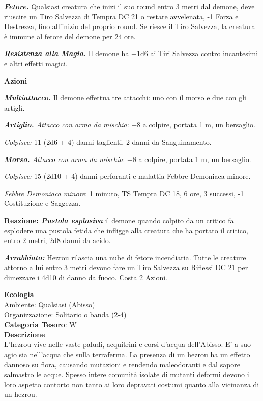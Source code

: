 \begin{multicols}{2}
{\emph{\textbf{Fetore.}} Qualsiasi creatura che inizi il suo round entro 3 metri dal demone, deve riuscire un Tiro Salvezza di Tempra DC 21 o restare avvelenata, -1 Forza e Destrezza, fino all'inizio del proprio round. Se riesce il Tiro Salvezza, la creatura è immune al fetore del demone per 24 ore.

\emph{\textbf{Resistenza alla Magia.}} Il demone ha +1d6 ai Tiri Salvezza contro incantesimi e altri effetti magici.

\textbf{Azioni}

\emph{\textbf{Multiattacco.}} Il demone effettua tre attacchi: uno con il morso e due con gli artigli.

\emph{\textbf{Artiglio.} Attacco con arma da mischia}: +8 a colpire, portata 1 m, un bersaglio.

\emph{Colpisce:} 11 (2d6 + 4) danni taglienti, 2 danni da Sanguinamento.

\emph{\textbf{Morso.} Attacco con arma da mischia}: +8 a colpire, portata 1 m, un bersaglio.

\emph{Colpisce:} 15 (2d10 + 4) danni perforanti e malattia Febbre Demoniaca minore.

\emph{Febbre Demoniaca minore}: 1 minuto, TS Tempra DC 18, 6 ore, 3 successi, -1 Costituzione e Saggezza.

\textbf{Reazione: \emph{Pustola esplosiva}} il demone quando colpito da un critico fa esplodere una pustola fetida che infligge alla creatura che ha portato il critico, entro 2 metri, 2d8 danni da acido.

\emph{\textbf{Arrabbiato:}} Hezrou rilascia una nube di fetore incendiaria. Tutte le creature attorno a lui entro 3 metri devono fare un Tiro Salvezza su Riflessi DC 21 per dimezzare i 4d10 di danno da fuoco. Costa 2 Azioni.

\textbf{Ecologia}\\
Ambiente: Qualsiasi (Abisso)\\
Organizzazione: Solitario o banda (2-4)\\
\textbf{Categoria Tesoro}: W\\
\textbf{Descrizione}\\
L'hezrou vive nelle vaste paludi, acquitrini e corsi d'acqua dell'Abisso. E' a suo agio sia nell'acqua che sulla terraferma. La presenza di un hezrou ha un effetto dannoso su flora, causando mutazioni e rendendo maleodoranti e dal sapore salmastro le acque. Spesso intere comunità isolate di mutanti deformi devono il loro aspetto contorto non tanto ai loro depravati costumi quanto alla vicinanza di un hezrou.

}
\end{multicols}

